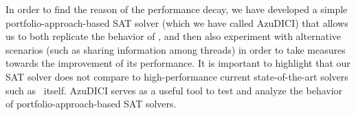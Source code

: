 In order to find the reason of the performance decay, we have
developed a simple portfolio-approach-based SAT solver (which we have
called AzuDICI) that allows us to both replicate the behavior of
\pling, and then also experiment with alternative scenarios (such as
sharing information among threads) in order to take measures towards
the improvement of its performance. It is important to highlight that
our SAT solver does not compare to high-performance current
state-of-the-art solvers such as \pling\ itself. AzuDICI serves as a
useful tool to test and analyze the behavior of
portfolio-approach-based SAT solvers.


